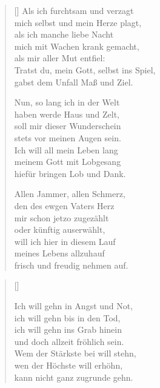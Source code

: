 \begin{multicols}{2}
\begin{verse}[\versewidth]
 Als ich furchtsam und verzagt\\
mich selbst und mein Herze plagt,\\
als ich manche liebe Nacht\\
mich mit Wachen krank gemacht,\\
als mir aller Mut entfiel:\\
Tratst du, mein Gott, selbst ins Spiel,\\
gabst dem Unfall Maß und Ziel.

 Nun, so lang ich in der Welt\\
haben werde Haus und Zelt,\\
soll mir dieser Wunderschein\\
stets vor meinen Augen sein.\\
Ich will all mein Leben lang\\
meinem Gott mit Lobgesang\\
hiefür bringen Lob und Dank.

 Allen Jammer, allen Schmerz,\\
den des ewgen Vaters Herz\\
mir schon jetzo zugezählt\\
oder künftig auserwählt,\\
will ich hier in diesem Lauf\\
meines Lebens allzuhauf\\
frisch und freudig nehmen auf.

\end{verse}
\end{multicols}

\begin{center}
\settowidth{\versewidth}{Der, vor dem die Welt erschrickt,}
\begin{verse}[\versewidth]
  
 Ich will gehn in Angst und Not,\\
ich will gehn bis in den Tod,\\
ich will gehn ins Grab hinein\\
und doch allzeit fröhlich sein.\\
Wem der Stärkste bei will stehn,\\
wen der Höchste will erhöhn,\\
kann nicht ganz zugrunde gehn.

\end{verse}
\end{center}


